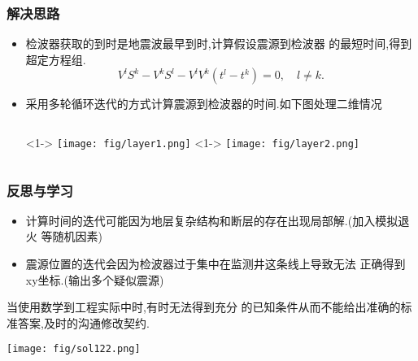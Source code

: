 \documentclass[UTF8]{ctexbeamer}	%
\theoremstyle{plain}
\theoremstyle{definition}
\theoremstyle{remark}
\numberwithin{equation}{section}
\begin{document}
\begin{frame}
    \frametitle{解决思路}
    \begin{itemize}
        \item 检波器获取的到时是地震波最早到时,计算假设震源到检波器
        的最短时间,得到超定方程组.
        \begin{equation}
            V^lS^k - V^kS^l - V^lV^k(t^l-t^k) =0, \quad l \neq k.
        \end{equation}
        \item 采用多轮循环迭代的方式计算震源到检波器的时间.如下图处理二维情况
        \begin{columns}
            <1->
                \texttt{[image: fig/layer1.png]}
            <1->
            \texttt{[image: fig/layer2.png]}
        \end{columns}
    \end{itemize}
\end{frame}

\begin{frame}
    \frametitle{反思与学习}
    \begin{itemize}
        \item 计算时间的迭代可能因为地层复杂结构和断层的存在出现局部解.(加入模拟退火
        等随机因素)
        \item 震源位置的迭代会因为检波器过于集中在监测井这条线上导致无法
        正确得到xy坐标.(输出多个疑似震源)
    \end{itemize}
    当使用数学到工程实际中时,有时无法得到充分
    的已知条件从而不能给出准确的标准答案,及时的沟通修改契约.
    \begin{center}
    \texttt{[image: fig/sol122.png]}
    \end{center}
\end{frame}
\end{document}
